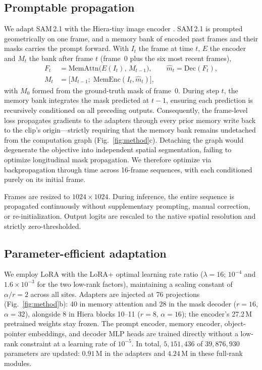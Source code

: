 \documentclass{article}
\begin{document}
\subsection{Promptable propagation}
\label{sec:prop}

We adapt SAM\,2.1 with the Hiera-tiny image encoder
\cite{ravi2025sam2,ryali2023hiera}. SAM\,2.1 is prompted geometrically on one frame, and a memory bank of encoded past frames and their masks carries the prompt forward. With $I_t$ the frame at
time $t$, $E$ the encoder and $M_t$ the bank after frame $t$ (frame~0 plus the six most recent frames),
\begin{equation}
\begin{split}
F_t &= \mathrm{MemAttn}\big(E(I_t),\, M_{t-1}\big),\qquad
\hat{m}_t = \mathrm{Dec}(F_t),\\
M_t &= \big[M_{t-1};\; \mathrm{MemEnc}(I_t, \hat{m}_t)\big],
\end{split}
\label{eq:recurrence}
\end{equation}
with $M_0$ formed from the ground-truth mask of frame~0. During step $t$, the memory bank integrates the mask predicted at $t-1$,
ensuring each prediction is recursively conditioned on all preceding outputs.
Consequently, the frame-level loss propagates gradients to the adapters
through every prior memory write back to the clip's origin---strictly
requiring that the memory bank remains undetached from the computation graph
(Fig.~\ref{fig:method}c). Detaching the graph would degenerate the
objective into independent spatial segmentation, failing to optimize
longitudinal mask propagation. We therefore optimize via backpropagation
through time across 16-frame sequences, with each conditioned purely on its
initial frame.

Frames are resized to $1024\times1024$. During
inference, the entire sequence is propagated continuously without
supplementary prompting, manual correction, or re-initialization. Output
logits are rescaled to the native spatial resolution and strictly
zero-thresholded.

\subsection{Parameter-efficient adaptation}
\label{sec:lora}

We employ LoRA \cite{hu2022lora} with the LoRA+ \cite{hayou2024loraplus} optimal learning rate ratio ($\lambda=16$; $10^{-4}$ and $1.6\times10^{-3}$ for the two low-rank factors), maintaining a scaling constant of $\alpha/r=2$ across all sites. Adapters are injected at 76 projections (Fig.~\ref{fig:method}b): 40 in memory attention and 28 in the mask decoder ($r=16$, $\alpha=32$), alongside 8 in Hiera blocks 10--11 ($r=8$, $\alpha=16$); the encoder's 27.2\,M pretrained weights stay frozen. The prompt encoder, memory encoder, object-pointer embeddings, and decoder MLP heads are trained directly without a low-rank constraint at a learning rate of $10^{-5}$. In total, $5{,}151{,}436$ of $39{,}876{,}930$ parameters are updated: $0.91$\,M in the adapters and $4.24$\,M in these full-rank modules.
\end{document}
